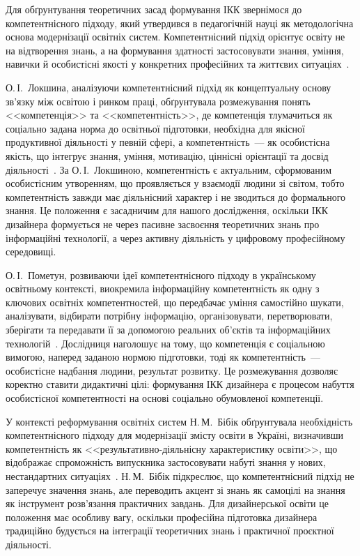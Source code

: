 
Для обґрунтування теоретичних засад формування ІКК звернімося до компетентнісного підходу, який утвердився в педагогічній науці як методологічна основа модернізації освітніх систем. Компетентнісний підхід орієнтує освіту не на відтворення знань, а на формування здатності застосовувати знання, уміння, навички й особистісні якості у конкретних професійних та життєвих ситуаціях~\cite{Musiienko2025DesignEducation}.

О.\,І.~Локшина, аналізуючи компетентнісний підхід як концептуальну основу зв'язку між освітою і ринком праці, обґрунтувала розмежування понять <<компетенція>> та <<компетентність>>, де компетенція тлумачиться як соціально задана норма до освітньої підготовки, необхідна для якісної продуктивної діяльності у певній сфері, а компетентність~--- як особистісна якість, що інтегрує знання, уміння, мотивацію, ціннісні орієнтації та досвід діяльності~\cite{Lokshyna2014Competency}. За О.\,І.~Локшиною, компетентність є актуальним, сформованим особистісним утворенням, що проявляється у взаємодії людини зі світом, тобто компетентність завжди має діяльнісний характер і не зводиться до формального знання. Це положення є засадничим для нашого дослідження, оскільки ІКК дизайнера формується не через пасивне засвоєння теоретичних знань про інформаційні технології, а через активну діяльність у цифровому професійному середовищі.

О.\,І.~Пометун, розвиваючи ідеї компетентнісного підходу в українському освітньому контексті, виокремила інформаційну компетентність як одну з ключових освітніх компетентностей, що передбачає уміння самостійно шукати, аналізувати, відбирати потрібну інформацію, організовувати, перетворювати, зберігати та передавати її за допомогою реальних об'єктів та інформаційних технологій~\cite{Pometun2004Competency}. Дослідниця наголошує на тому, що компетенція є соціальною вимогою, наперед заданою нормою підготовки, тоді як компетентність~--- особистісне надбання людини, результат розвитку. Це розмежування дозволяє коректно ставити дидактичні цілі: формування ІКК дизайнера є процесом набуття особистісної компетентності на основі соціально обумовленої компетенції.

У контексті реформування освітніх систем Н.\,М.~Бібік обґрунтувала необхідність компетентнісного підходу для модернізації змісту освіти в Україні, визначивши компетентність як <<результативно-діяльнісну характеристику освіти>>, що відображає спроможність випускника застосовувати набуті знання у нових, нестандартних ситуаціях~\cite{Bibik2004Competency}. Н.\,М.~Бібік підкреслює, що компетентнісний підхід не заперечує значення знань, але переводить акцент зі знань як самоцілі на знання як інструмент розв'язання практичних завдань. Для дизайнерської освіти це положення має особливу вагу, оскільки професійна підготовка дизайнера традиційно будується на інтеграції теоретичних знань і практичної проєктної діяльності.


